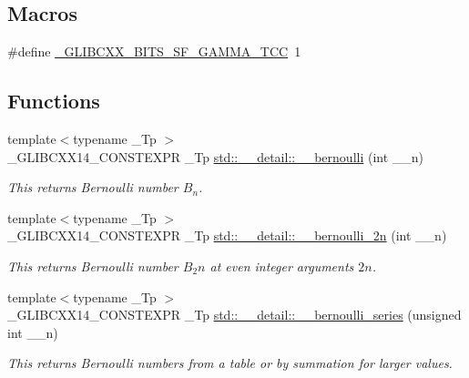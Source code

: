 \subsection*{Macros}
\begin{DoxyCompactItemize}
\item 
\#define \hyperlink{sf__gamma_8tcc_accc383e52e4dc6eebfd313a52961b49b}{\+\_\+\+G\+L\+I\+B\+C\+X\+X\+\_\+\+B\+I\+T\+S\+\_\+\+S\+F\+\_\+\+G\+A\+M\+M\+A\+\_\+\+T\+CC}~1
\end{DoxyCompactItemize}
\subsection*{Functions}
\begin{DoxyCompactItemize}
\item 
{\footnotesize template$<$typename \+\_\+\+Tp $>$ }\\\+\_\+\+G\+L\+I\+B\+C\+X\+X14\+\_\+\+C\+O\+N\+S\+T\+E\+X\+PR \+\_\+\+Tp \hyperlink{namespacestd_1_1____detail_a5dc6cb42a6bcd3258371b6cc93ee12f0}{std\+::\+\_\+\+\_\+detail\+::\+\_\+\+\_\+bernoulli} (int \+\_\+\+\_\+n)
\begin{DoxyCompactList}\small\item\em This returns Bernoulli number $ B_n $. \end{DoxyCompactList}\item 
{\footnotesize template$<$typename \+\_\+\+Tp $>$ }\\\+\_\+\+G\+L\+I\+B\+C\+X\+X14\+\_\+\+C\+O\+N\+S\+T\+E\+X\+PR \+\_\+\+Tp \hyperlink{namespacestd_1_1____detail_a72c7ddb85ace9619af583ca2acdb0a9b}{std\+::\+\_\+\+\_\+detail\+::\+\_\+\+\_\+bernoulli\+\_\+2n} (int \+\_\+\+\_\+n)
\begin{DoxyCompactList}\small\item\em This returns Bernoulli number $ B_2n $ at even integer arguments $ 2n $. \end{DoxyCompactList}\item 
{\footnotesize template$<$typename \+\_\+\+Tp $>$ }\\\+\_\+\+G\+L\+I\+B\+C\+X\+X14\+\_\+\+C\+O\+N\+S\+T\+E\+X\+PR \+\_\+\+Tp \hyperlink{namespacestd_1_1____detail_ad3d3e44d340742b0362a8ad95080d315}{std\+::\+\_\+\+\_\+detail\+::\+\_\+\+\_\+bernoulli\+\_\+series} (unsigned int \+\_\+\+\_\+n)
\begin{DoxyCompactList}\small\item\em This returns Bernoulli numbers from a table or by summation for larger values. \end{DoxyCompactList}\item 

\end{DoxyCompactItemize}
